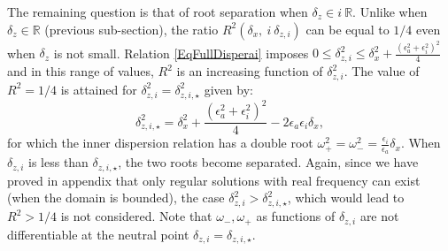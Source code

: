 \documentclass[a4paper,11pt]{article}
\begin{document}
The remaining question is that of root separation when $\delta_z\in i\ \mathbb{R}$. Unlike when $\delta_z\in \mathbb{R}$ (previous sub-section), the ratio $R^2(\delta_x,\ i\ \delta_{z,i})$ can be equal to $1/4$ even when $\delta_z$ is not small.
Relation \ref{EqFullDisperai} imposes $0\le \delta_{z,i}^2\le \delta_x^2+\frac{(\epsilon_a^2+\epsilon_i^2)^2}{4}$ and in this range of values, $R^2$ is an increasing function of $\delta_{z,i}^2$. The value of $R^2=1/4$ is attained for $\delta_{z,i}^2=\delta_{z,i,\star}^2$ given by:
%
\begin{equation}
	\delta_{z,i,\star}^2=\delta_x^2+\frac{(\epsilon_a^2+\epsilon_i^2)^2}{4}-2\epsilon_a\epsilon_i\delta_x,
	\label{deltazi}
\end{equation} 
%
for which the inner dispersion relation has a double root $\displaystyle \omega_+^2 = \omega_-^2 = \frac{\epsilon_i}{\epsilon_a}\delta_x$.
When $\delta_{z,i}$ is less than $\delta_{z,i,\star}$, the two roots become separated.
Again, since we have proved in appendix that only regular solutions with real frequency can exist (when the domain is bounded), the case $\delta_{z,i}^2>\delta_{z,i,\star}^2$, which would lead to $R^2 > 1/4$ is not considered. Note that $\omega_-, \omega_+$ as functions of $\delta_{z,i}$ are not differentiable at the neutral point $\delta_{z,i}=\delta_{z,i,\star}$.
\end{document}
